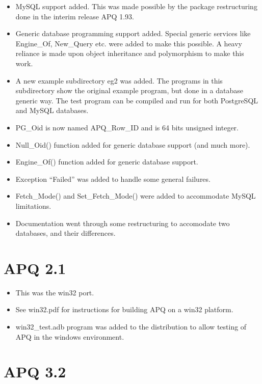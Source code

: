 \documentclass[english,letterpaper]{book}
\newcommand\apqversion{3.2}
\begin{document}
\begin{itemize}
   \item MySQL support added. This was made possible by the package restructuring
         done in the interim release APQ 1.93.
   \item Generic database programming support added. Special generic services
         like Engine\_Of, New\_Query etc. were added to make this possible.
         A heavy reliance is made upon object inheritance and polymorphism
         to make this work.
   \item A new example subdirectory eg2 was added. The programs in this subdirectory
         show the original example program, but done in a database generic
         way. The test program can be compiled and run for both PostgreSQL
         and MySQL databases.
   \item PG\_Oid is now named APQ\_Row\_ID and is 64 bits unsigned integer.
   \item Null\_Oid() function added for generic database support (and much
         more).
   \item Engine\_Of() function added for generic database support.
   \item Exception {}``Failed'' was added to handle some general failures.
   \item Fetch\_Mode() and Set\_Fetch\_Mode() were added to accommodate MySQL
         limitations.
   \item Documentation went through some restructuring to accomodate two databases,
         and their differences.
\end{itemize}

\section*{APQ 2.1}

\begin{itemize}
   \item This was the win32 port.
   \item See win32.pdf for instructions for building APQ on a win32 platform.
   \item win32\_test.adb program was added to the distribution to allow testing
         of APQ in the windows environment.
\end{itemize}

\section*{APQ \apqversion}
\end{document}
